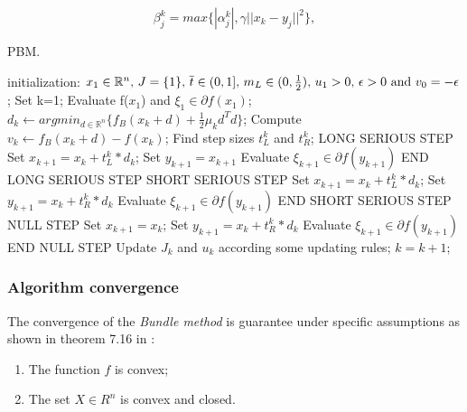 \begin{equation}
\beta_{j}^k = max\{|\alpha_{j}^k|,\gamma || x_{k}-y_{j} ||^2\},
\end{equation}
\begin{algorithm}[H]
	\caption{PBM.}
	\label{alg:PBM}
	\begin{algorithmic}[4]
		\State initialization:
		\State $x_1 \in \mathbb{R}^n, \,  J=\{1\}, \, \overline{t} \in (0,1], \, m_{L} \in (0,\frac{1}{2}), \, u_1>0, \, \epsilon>0 \textnormal{ and } v_0= -\epsilon$;
		\State Set k=1;
		\State Evaluate f($x_1$) and $ \xi_1 \in \partial f (x_1)$;
		\Repeat
		\State $d_k\leftarrow argmin_{d\in \mathbb{R}^n }\{f_B(x_{k} + d) +\frac{1}{2}\mu_{k}d^{T}d\}$;
		\State Compute $v_{k} \leftarrow f_B(x_{k} + d) - f(x_k)$;
		\State Find step sizes $t^{k}_{L}$ and  $t^{k}_{R}$;
				\State LONG SERIOUS STEP
				\State Set $x_{k+1}= x_{k} + t^{k}_{L}*d_{k}$;
				\State Set $y_{k+1}= x_{k+1}$
				\State Evaluate $\xi_{k+1} \in \partial f (y_{k+1})$ 
				\State END LONG SERIOUS STEP
			\Else
				\State SHORT SERIOUS STEP
				\State Set $x_{k+1}= x_{k} + t^{k}_{L}*d_{k}$;
				\State Set $y_{k+1}= x_{k}+t^{k}_{R}*d_{k}$
				\State Evaluate $\xi_{k+1} \in \partial f (y_{k+1})$ 
				\State END SHORT SERIOUS STEP
			\EndIf
		\Else
			\State NULL STEP
			\State Set $x_{k+1}= x_{k}$;
			\State Set $y_{k+1}= x_{k}+t^{k}_{R}*d_{k}$
			\State Evaluate $\xi_{k+1} \in \partial f (y_{k+1})$ 
			\State END NULL STEP		
		\EndIf
		\State Update $J_{k}$ and $u_{k}$ according some updating rules;
		\State $k=k+1$;
		\EndProcedure 
	\end{algorithmic}
\end{algorithm}


\subsubsection{Algorithm convergence}
\label{PBM-Convergence}
The convergence of the \textit{Bundle method} is guarantee under specific assumptions as shown in theorem 7.16 in \cite{NonOpt}:
\begin{enumerate} \label{convergence:assBM}
	\item The function $f$ is convex;
	\item The set $X \in R^n$ is convex and closed.
\end{enumerate}

